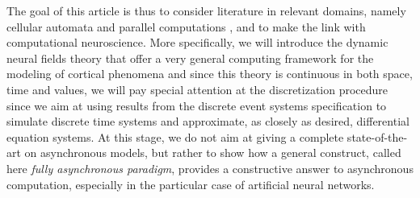 The goal of this article is thus to consider literature in relevant domains, namely cellular automata \cite{Fates:2005,Fates:2008,Garcia:2006,Barret:1999} and parallel computations \cite{Bertsekas:1991,Bertsekas:1997}, and to make the link with computational neuroscience. More specifically, we will introduce the dynamic neural fields theory that offer a very general computing framework for the modeling of cortical phenomena and since this theory is continuous in both space, time and values, we will pay special attention at the discretization procedure since we aim at using results from the discrete event systems specification to simulate discrete time systems and approximate, as closely as desired, differential equation systems. At this stage, we do not aim at giving a complete state-of-the-art on asynchronous models, but rather to show how a general construct, called here {\em fully asynchronous paradigm}, provides a constructive answer to asynchronous computation, especially in the particular case of artificial neural networks.





